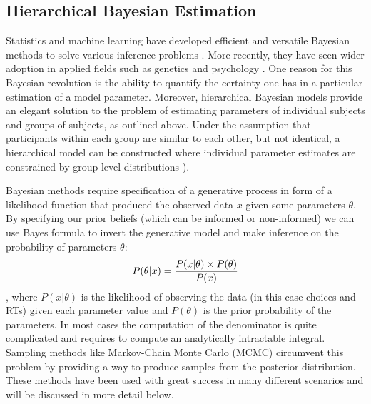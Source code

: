 \documentclass[letterpaper,10pt,english]{article}
\begin{document}
\subsection*{Hierarchical Bayesian Estimation}
\label{methods:hierarchical-bayesian-estimation}
Statistics and machine learning have developed efficient and versatile Bayesian methods to solve various inference problems \citep{Poirier06}. More recently, they have seen wider adoption in applied fields such as genetics \citep{StephensBalding09} and psychology \citep{ClemensDeSelenEtAl11}. One reason for this Bayesian revolution is the ability to quantify the certainty one has in a particular estimation of a model parameter. Moreover, hierarchical Bayesian models provide an elegant solution to the problem of estimating parameters of individual subjects and groups of subjects, as outlined above. Under the assumption that participants within each group are similar to each other, but not identical, a hierarchical model can be constructed where individual parameter estimates are constrained by group-level distributions \citep{NilssonRieskampWagenmakers11,ShiffrinLeeKim08}).

Bayesian methods require specification of a generative process in form
of a likelihood function that produced the observed data $x$
given some parameters $\theta$. By specifying our prior beliefs
(which can be informed or non-informed) we can use Bayes formula to
invert the generative model and make inference on the probability of
parameters $\theta$:
\label{methods:bayes}\begin{gather}
\begin{split}P(\theta|x) = \frac{P(x|\theta) \times P(\theta)}{P(x)}\end{split}\notag
\end{gather},
where $P(x|\theta)$ is the likelihood of observing the data (in
this case choices and RTs) given each parameter value and
$P(\theta)$ is the prior probability of the parameters. In most
cases the computation of the denominator is quite complicated and
requires to compute an analytically intractable integral. Sampling
methods like Markov-Chain Monte Carlo (MCMC) \citep{GamermanLopes06}
circumvent this problem by providing a way to produce samples from the
posterior distribution. These methods have been used with great
success in many different scenarios \citep{GelmanCarlinSternEtAl03}
and will be discussed in more detail below.
\end{document}
